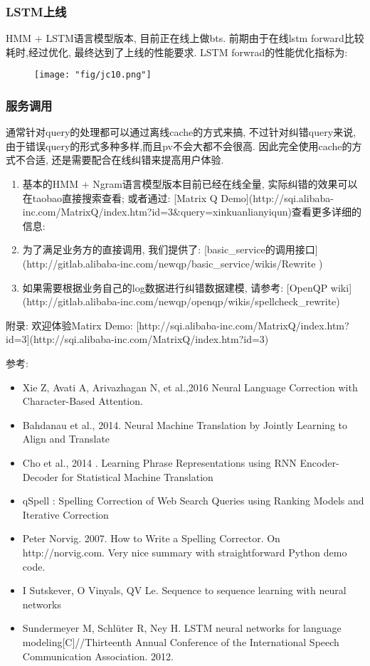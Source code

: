 \subsubsection{LSTM上线}

HMM + LSTM语言模型版本, 目前正在线上做bts. 前期由于在线lstm forward比较耗时,经过优化, 最终达到了上线的性能要求. LSTM forwrad的性能优化指标为:

\begin{figure}[!h]
	\centering
	\texttt{[image: "fig/jc10.png"]}
	\caption{}
	\label{fig:jc10}
\end{figure}

\subsubsection{服务调用}

通常针对query的处理都可以通过离线cache的方式来搞, 不过针对纠错query来说, 由于错误query的形式多种多样,而且pv不会大都不会很高. 因此完全使用cache的方式不合适, 还是需要配合在线纠错来提高用户体验.
\begin{enumerate}
\item 基本的HMM + Ngram语言模型版本目前已经在线全量, 实际纠错的效果可以在taobao直接搜索查看; 或者通过: [Matrix Q Demo](http://sqi.alibaba-inc.com/MatrixQ/index.htm?id=3\&query=xinkuanlianyiqun)查看更多详细的信息:
\item 为了满足业务方的直接调用, 我们提供了: [basic\_service的调用接口](http://gitlab.alibaba-inc.com/newqp/basic\_service/wikis/Rewrite )
\item 如果需要根据业务自己的log数据进行纠错数据建模, 请参考: [OpenQP wiki](http://gitlab.alibaba-inc.com/newqp/openqp/wikis/spellcheck\_rewrite)
\end{enumerate}

附录: 欢迎体验Matirx Demo: [http://sqi.alibaba-inc.com/MatrixQ/index.htm?id=3](http://sqi.alibaba-inc.com/MatrixQ/index.htm?id=3)

参考:
\begin{itemize}
\item Xie Z, Avati A, Arivazhagan N, et al.,2016 Neural Language Correction with Character-Based Attention.
\item Bahdanau et al., 2014. Neural Machine Translation by Jointly Learning to Align and Translate
\item Cho et al., 2014 . Learning Phrase Representations using RNN Encoder-Decoder for Statistical Machine Translation
\item qSpell : Spelling Correction of Web Search Queries using Ranking Models and Iterative Correction
\item Peter Norvig. 2007. How to Write a Spelling Corrector. On http://norvig.com. Very nice summary with straightforward Python demo code.
\item I Sutskever, O Vinyals, QV Le. Sequence to sequence learning with neural networks
\item Sundermeyer M, Schlüter R, Ney H. LSTM neural networks for language modeling[C]//Thirteenth Annual Conference of the International Speech Communication Association. 2012.
\end{itemize}

